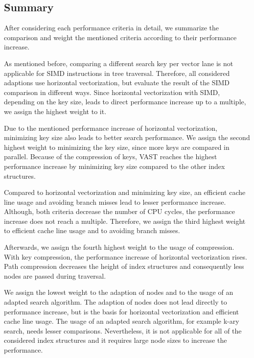 \documentclass[conference]{IEEEtran}
\begin{document}
\subsection{Summary}

After considering each performance criteria in detail, we summarize the comparison and weight the mentioned criteria according to their performance increase. 

As mentioned before, comparing a different search key per vector lane is not applicable for SIMD instructions in tree traversal. Therefore, all considered adaptions use horizontal vectorization, but evaluate the result of the SIMD comparison in different ways. Since horizontal vectorization with SIMD, depending on the key size, leads to direct performance increase up to a multiple, we assign the highest weight to it. 

Due to the mentioned performance increase of horizontal vectorization, minimizing key size also leads to better search performance. We assign the second highest weight to minimizing the key size, since more keys are compared in parallel. Because of the compression of keys, VAST reaches the highest performance increase by minimizing key size compared to the other index structures. 

Compared to horizontal vectorization and minimizing key size, an efficient cache line usage and avoiding branch misses lead to lesser performance increase. Although, both criteria decrease the number of CPU cycles, the performance increase does not reach a multiple. Therefore, we assign the third highest weight to efficient cache line usage and to avoiding branch misses.

Afterwards, we assign the fourth highest weight to the usage of compression. With key compression, the performance increase of horizontal vectorization rises. Path compression decreases the height of index structures and consequently less nodes are passed during traversal. 

We assign the lowest weight to the adaption of nodes and to the usage of an adapted search algorithm. The adaption of nodes does not lead directly to performance increase, but is the basis for horizontal vectorization and efficient cache line usage. The usage of an adapted search algorithm, for example k-ary search, needs lesser comparisons. Nevertheless, it is not applicable for all of the considered index structures and it requires large node sizes to increase the performance.  
\end{document}
